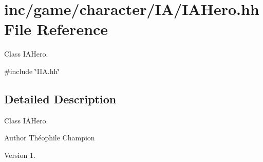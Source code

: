 \hypertarget{IAHero_8hh}{}\section{inc/game/character/\+I\+A/\+I\+A\+Hero.hh File Reference}
\label{IAHero_8hh}


Class I\+A\+Hero.  


{\ttfamily \#include \char`\"{}I\+I\+A.\+hh\char`\"{}}\newline


\subsection{Detailed Description}
Class I\+A\+Hero. 

\begin{DoxyAuthor}{Author}
Théophile Champion 
\end{DoxyAuthor}
\begin{DoxyVersion}{Version}
1. 
\end{DoxyVersion}
